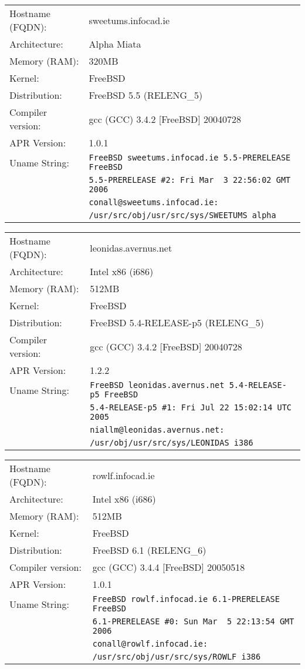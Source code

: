 \begin{tabular}{ll}
Hostname (FQDN):	&	sweetums.infocad.ie 				\\
Architecture:		&	Alpha Miata							\\
Memory (RAM):		&	320MB									\\
Kernel:				&	FreeBSD								\\
Distribution:		&	FreeBSD 5.5 (RELENG\_5)			\\
Compiler version:	&	gcc (GCC) 3.4.2 [FreeBSD] 20040728\\
APR Version:		&	1.0.1									\\
Uname String:		& \verb!FreeBSD sweetums.infocad.ie 5.5-PRERELEASE FreeBSD!\\
						& \verb!5.5-PRERELEASE #2: Fri Mar  3 22:56:02 GMT 2006! \\
						& \verb!conall@sweetums.infocad.ie:! \\
						&	\verb!/usr/src/obj/usr/src/sys/SWEETUMS alpha!\\
\end{tabular}

\begin{tabular}{ll}
Hostname (FQDN):	&	leonidas.avernus.net				\\
Architecture:		&	Intel x86 (i686)					\\
Memory (RAM):		&	512MB									\\
Kernel:				&	FreeBSD								\\
Distribution:		&	FreeBSD 5.4-RELEASE-p5 (RELENG\_5)			\\
Compiler version:	&	gcc (GCC) 3.4.2 [FreeBSD] 20040728\\
APR Version:		&	1.2.2									\\
Uname String:		&	\verb!FreeBSD leonidas.avernus.net 5.4-RELEASE-p5 FreeBSD! \\ 
						&	\verb!5.4-RELEASE-p5 #1: Fri Jul 22 15:02:14 UTC 2005! \\
						& 	\verb!niallm@leonidas.avernus.net:! \\
						&	\verb!/usr/obj/usr/src/sys/LEONIDAS i386!

\end{tabular}

\begin{tabular}{ll}
Hostname (FQDN):	&	rowlf.infocad.ie 					\\
Architecture:		&	Intel x86 (i686)					\\
Memory (RAM):		&	512MB									\\
Kernel:				&	FreeBSD								\\
Distribution:		&	FreeBSD 6.1 (RELENG\_6)			\\
Compiler version:	&	gcc (GCC) 3.4.4 [FreeBSD] 20050518	\\
APR Version:		&	1.0.1									\\
Uname String:		& \verb!FreeBSD rowlf.infocad.ie 6.1-PRERELEASE FreeBSD!\\
						& \verb!6.1-PRERELEASE #0: Sun Mar  5 22:13:54 GMT 2006!\\
						& \verb!conall@rowlf.infocad.ie:! \\
						& \verb!/usr/src/obj/usr/src/sys/ROWLF i386! \\
\end{tabular}

